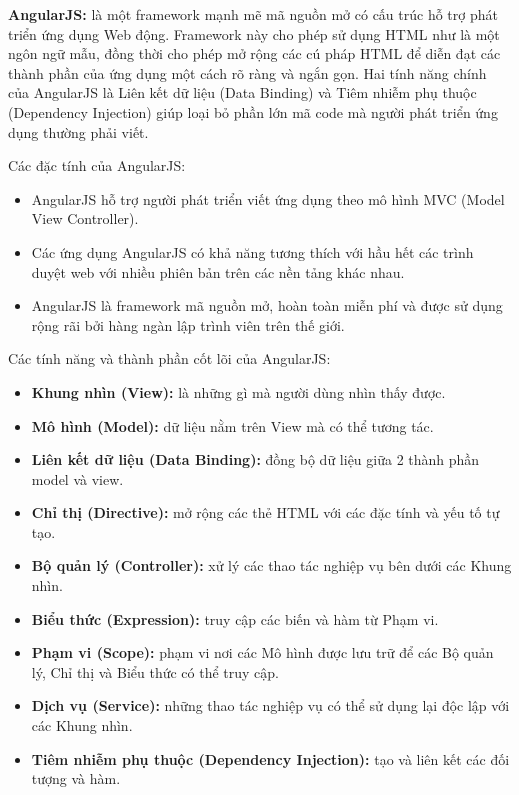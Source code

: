 \documentclass[12pt,a4paper,oneside]{extbook}
\begin{document}
\textbf{AngularJS:} là một framework mạnh mẽ mã nguồn mở có cấu trúc hỗ trợ phát triển ứng dụng Web động. Framework này cho phép sử dụng HTML như là một ngôn ngữ mẫu, đồng thời cho phép mở rộng các cú pháp HTML để diễn đạt các thành phần của ứng dụng một cách rõ ràng và ngắn gọn. Hai tính năng chính của AngularJS là Liên kết dữ liệu (Data Binding) và Tiêm nhiễm phụ thuộc (Dependency Injection) giúp loại bỏ phần lớn mã code mà người phát triển ứng dụng thường phải viết.

Các đặc tính của AngularJS:
\begin{itemize}[topsep=1mm,itemsep=-0.5mm]
\item AngularJS hỗ trợ người phát triển viết ứng dụng theo mô hình MVC (Model View Controller).
\item Các ứng dụng AngularJS có khả năng tương thích với hầu hết các trình duyệt web với nhiều phiên bản trên các nền tảng khác nhau.
\item AngularJS là framework mã nguồn mở, hoàn toàn miễn phí và được sử dụng rộng rãi bởi hàng ngàn lập trình viên trên thế giới.
\vspace{1mm}
\end{itemize}

Các tính năng và thành phần cốt lõi của AngularJS:

\begin{itemize}[topsep=1mm,itemsep=-0.5mm]
\item \textbf{Khung nhìn (View):} là những gì mà người dùng nhìn thấy được.
\item \textbf{Mô hình (Model):} dữ liệu nằm trên View mà có thể tương tác.
\item \textbf{Liên kết dữ liệu (Data Binding):} đồng bộ dữ liệu giữa 2 thành phần model và view.
\item \textbf{Chỉ thị (Directive):} mở rộng các thẻ HTML với các đặc tính và yếu tố tự tạo.
\item \textbf{Bộ quản lý (Controller):} xử lý các thao tác nghiệp vụ bên dưới các Khung nhìn.
\item \textbf{Biểu thức (Expression):} truy cập các biến và hàm từ Phạm vi.
\item \textbf{Phạm vi (Scope):} phạm vi nơi các Mô hình được lưu trữ để các Bộ quản lý, Chỉ thị và Biểu thức có thể truy cập.
\item \textbf{Dịch vụ (Service):} những thao tác nghiệp vụ có thể sử dụng lại độc lập với các Khung nhìn.
\item \textbf{Tiêm nhiễm phụ thuộc (Dependency Injection):} tạo và liên kết các đối tượng và hàm.
\vspace{1mm}
\end{itemize}
\end{document}

